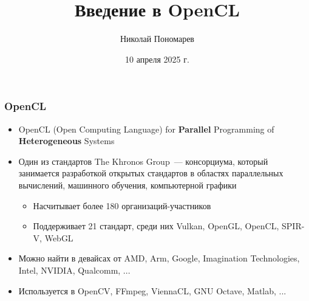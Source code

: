 \documentclass[
    aspectratio=169,
]{beamer}
\title{Введение в OpenCL}
\author{Николай Пономарев}
\institute[Матмех СПбГУ]{Математико-механический факультет СПбГУ}
\date{10 апреля 2025 г.}
\begin{document}
\begin{frame}
    \maketitle
\end{frame}

\begin{frame}
    \frametitle{OpenCL}

    \begin{itemize}
        \item OpenCL (Open Computing Language) for \textbf{Parallel} Programming of \textbf{Heterogeneous} Systems
        \item Один из стандартов The Khronos Group~--- консорциума, который занимается разработкой открытых стандартов в областях параллельных вычислений, машинного обучения, компьютерной графики
              \begin{itemize}
                  \item Насчитывает более 180 организаций-участников
                  \item Поддерживает 21 стандарт, среди них Vulkan, OpenGL, OpenCL, SPIR-V, WebGL
              \end{itemize}
        \item Можно найти в девайсах от AMD, Arm, Google, Imagination Technologies, Intel, NVIDIA, Qualcomm, ...
        \item Используется в OpenCV, FFmpeg, ViennaCL, GNU Octave, Matlab, ...
    \end{itemize}

\end{frame}
\end{document}
